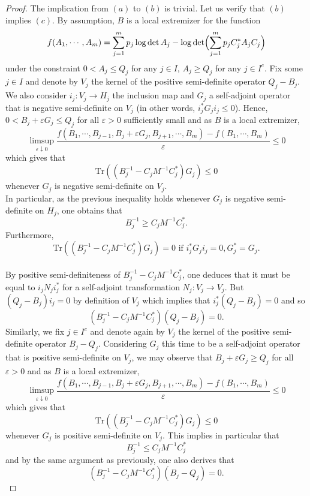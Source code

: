 \documentclass[11pt,a4paper,reqno]{amsart}
\numberwithin{equation}{section}
\theoremstyle{definition}
\newcommand{\<}{\ensuremath \leq}
\renewcommand{\>}{\ensuremath \geq}
\renewcommand{\epsilon}{\varepsilon}
\begin{document}
\begin{proof}
    The implication from $(a)$ to $(b)$ is trivial. Let us verify that $(b)$ implies $(c)$. 
    By assumption, $B$ is a local extremizer for the function $$f(A_1,\cdots,A_m)=\sum_{j=1}^m p_j \log \det A_j -\log \det \Bigl(\sum_{j=1}^m p_jC_j^*A_jC_j \Bigl)$$ under the constraint $0<A_j \leq Q_j$ for any $j \in I$, $A_j \ge Q_j$ for any $j \in I^c.$ Fix some $j \in I$ and denote by $V_j$ the kernel of the positive semi-definite operator $Q_j-B_j.$ We also consider $\textit{i}_j: V_j \rightarrow H_j$ the inclusion map and $G_j$ a self-adjoint operator that is negative semi-definite on $V_j$ (in other words,  $\textit{i}_j^*G_j\textit{i}_j \leq 0$). Hence, $0<B_j+\epsilon G_j \leq Q_j$ for all $\epsilon>0$ sufficiently small and as $B$ is a local extremizer, $$\limsup_{\epsilon \downarrow 0}\frac{f(B_1,\cdots,B_{j-1},B_j+\epsilon G_j,B_{j+1},\cdots,B_m)-f(B_1,\cdots,B_m)}{\epsilon} \leq 0$$ which gives that $$\mathrm{Tr}((B_j^{-1}-C_jM^{-1}C_j^*)G_j) \leq 0$$ whenever $G_j$ is negative semi-definite on $V_j.$ \hfill \\ In particular, as the previous inequality holds whenever $G_j$ is negative semi-definite on $H_j$, one obtains that $$B_j^{-1} \geq C_jM^{-1}C_j^*.$$ Furthermore, $$\mathrm{Tr}((B_j^{-1}-C_jM^{-1}C_j^*)G_j)=0 \text{ if } \textit{i}_j^*G_j\textit{i}_j=0, G_j^*=G_j.$$ \hfill \\ By positive semi-definiteness of $B_j^{-1}-C_jM^{-1}C_j^*$, one deduces that it must be equal to $\textit{i}_jN_j\textit{i}_j^*$ for a self-adjoint transformation $N_j: V_j \rightarrow V_j.$  But $(Q_j-B_j)\textit{i}_j=0$ by definition of $V_j$ which implies that $\textit{i}_j^*(Q_j-B_j)=0$ and so $$(B_j^{-1}-C_jM^{-1}C_j^*)(Q_j-B_j)=0.$$ 
    Similarly, we fix $j \in I^c$ and denote again by $V_j$ the kernel of the positive semi-definite operator $B_j-Q_j.$ Considering $G_j$ this time to be a self-adjoint operator that is positive semi-definite on $V_j$, we may observe that $B_j+\epsilon G_j \ge Q_j$ for all $\epsilon>0$ and as $B$ is a local extremizer, $$\limsup_{\epsilon \downarrow 0}\frac{f(B_1,\cdots,B_{j-1},B_j+\epsilon G_j,B_{j+1},\cdots,B_m)-f(B_1,\cdots,B_m)}{\epsilon} \leq 0$$ which gives that $$\mathrm{Tr}((B_j^{-1}-C_jM^{-1}C_j^*)G_j) \leq 0$$ whenever $G_j$ is positive semi-definite on $V_j.$ This implies in particular that $$B_j^{-1} \le C_jM^{-1}C_j^*$$ and by the same argument as previously, one also derives that $$(B_j^{-1}-C_jM^{-1}C_j^*)(B_j-Q_j)=0.$$
    

\end{proof}
\end{document}
